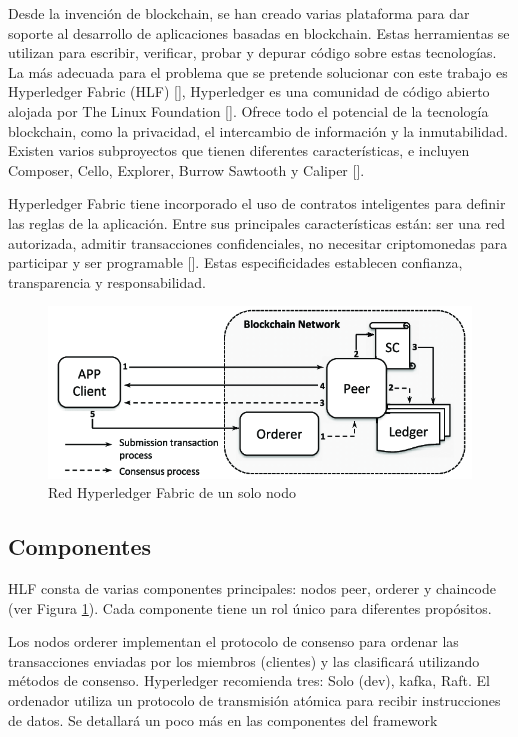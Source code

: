 Desde la invención de blockchain, se han creado varias plataforma para dar soporte al desarrollo de aplicaciones basadas en blockchain.
Estas herramientas se utilizan para escribir, verificar, probar y depurar código sobre estas tecnologías. 
La más adecuada para el problema que se pretende solucionar con este trabajo es Hyperledger Fabric (HLF) [\cite{kumutha2021impact}], Hyperledger es una comunidad de código abierto alojada por The Linux Foundation [\cite{nakamoto2008bitcoin}]. 
Ofrece todo el potencial de la tecnología blockchain, como la privacidad, el intercambio de información y la inmutabilidad. Existen varios subproyectos que tienen diferentes características, e incluyen Composer, Cello, Explorer, Burrow Sawtooth y Caliper [\cite{ullah2021blockchain}].

Hyperledger Fabric tiene incorporado el uso de contratos inteligentes para definir las reglas de la aplicación. Entre sus principales características están: ser una red autorizada, admitir transacciones confidenciales, no necesitar criptomonedas para participar y ser programable [\cite{ullah2021blockchain}]. Estas especificidades establecen confianza, transparencia y responsabilidad.

\begin{figure}[h!]
	\centering
	\includegraphics[width=\linewidth]{Graphics/single_node_network.png}
	\caption{Red Hyperledger Fabric de un solo nodo}
	\label{fig:2}
\end{figure}


\subsection{Componentes}

HLF consta de varias componentes principales: nodos peer, orderer y chaincode (ver Figura \ref{fig:2}). Cada componente tiene un rol único para diferentes propósitos.

Los nodos orderer implementan el protocolo de consenso para ordenar las transacciones enviadas por los miembros (clientes) y las clasificará utilizando métodos de consenso. Hyperledger recomienda tres: Solo (dev), kafka, Raft. El ordenador utiliza un protocolo de transmisión atómica para recibir instrucciones de datos. Se detallará un poco más en las componentes del framework


